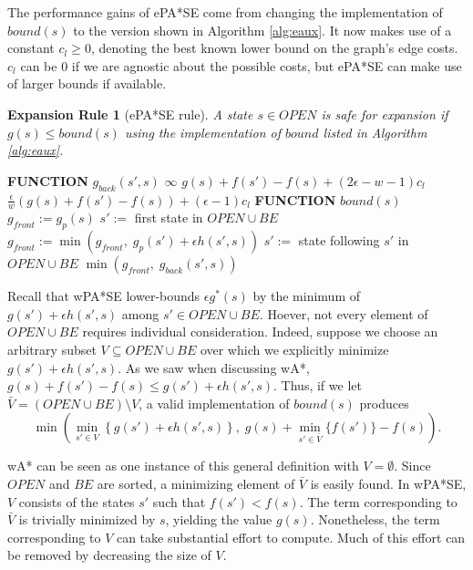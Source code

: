 \documentclass[letterpaper]{article}
\newtheorem{rul}{Expansion Rule}
\begin{document}
The performance gains of ePA*SE come from changing the implementation of $bound(s)$ to the version shown in Algorithm \ref{alg:eaux}. It now makes use of a constant $c_l \ge 0$, denoting the best known lower bound on the graph's edge costs. $c_l$ can be 0 if we are agnostic about the possible costs, but ePA*SE can make use of larger bounds if available.

\begin{rul}[ePA*SE rule]
A state $s\in OPEN$ is safe for expansion if $g(s) \le bound(s)$ using the implementation of $bound$ listed in Algorithm \ref{alg:eaux}.
\end{rul}

\begin{algorithm}
\caption{$bound(s)$ enhanced for ePA*SE/PARA*}
\label{alg:eaux}
\begin{algorithmic}
\STATE \textbf{FUNCTION} $g_{back}(s',s)$
\RETURN $\infty$
\RETURN $g(s) + f(s') - f(s) + (2\epsilon-w-1)c_l$
\ELSE
\RETURN $\frac\epsilon w\left(g(s) + f(s') - f(s)\right) + (\epsilon-1)c_l$
\ENDIF
\STATE \textbf{FUNCTION} $bound(s)$
\STATE $g_{front} := g_p(s)$
\STATE $s' :=$ first state in $OPEN \cup BE$
\STATE $g_{front} := \min(g_{front},\;g_p(s') + \epsilon h(s',s))$
\STATE $s' :=$ state following $s'$ in $OPEN \cup BE$
\ENDWHILE
\RETURN $\min(g_{front},\;g_{back}(s',s))$
\end{algorithmic}
\end{algorithm}

Recall that wPA*SE lower-bounds $\epsilon g^*(s)$ by the minimum of $g(s') + \epsilon h(s',s)$ among $s'\in OPEN\cup BE$. Hoever, not every element of $OPEN\cup BE$ requires individual consideration. Indeed, suppose we choose an arbitrary subset $V\subseteq OPEN\cup BE$ over which we explicitly minimize $g(s') + \epsilon h(s',s)$. As we saw when discussing wA*, $g(s) + f(s') - f(s) \le g(s') + \epsilon h(s',s)$. Thus, if we let $\bar V = (OPEN\cup BE)\setminus V$, a valid implementation of $bound(s)$ produces 
\[\min\left(\min_{s'\in V}\left\{g(s') + \epsilon h(s',s)\right\},\;g(s) + \min_{s'\in\bar V} \{f(s')\} - f(s)  \right).\]

wA* can be seen as one instance of this general definition with $V = \emptyset$. Since $OPEN$ and $BE$ are sorted, a minimizing element of $\bar V$ is easily found. In wPA*SE, $V$ consists of the states $s'$ such that $f(s') < f(s)$. The term corresponding to $\bar V$ is trivially minimized by $s$, yielding the value $g(s)$. Nonetheless, the term corresponding to $V$ can take substantial effort to compute. Much of this effort can be removed by decreasing the size of $V$.
\end{document}
